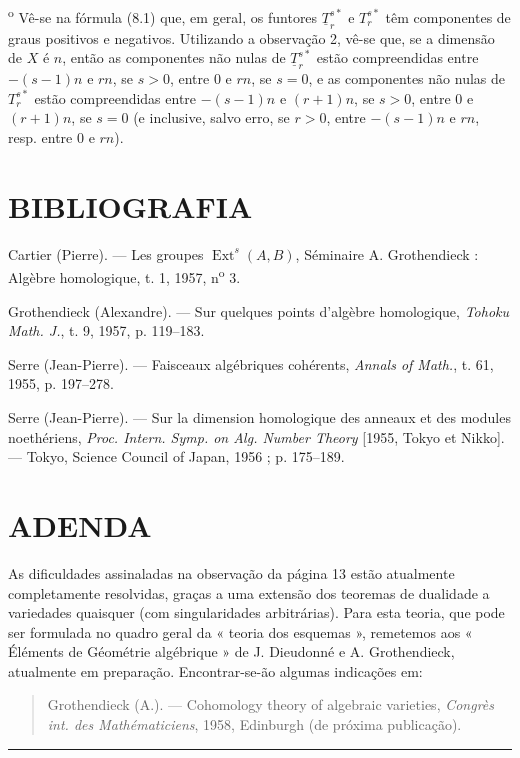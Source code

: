 \medskip
{}\textsuperscript{o} Vê-se na fórmula (8.1) que, em geral, os
funtores $\underline{T}_{r}^{s*}$ e $T_{r}^{s*}$ têm componentes de
graus positivos e negativos. Utilizando a observação 2, vê-se que, se a
dimensão de $X$ é $n$, então as componentes não nulas de
$\underline{T}_{r}^{s*}$ estão compreendidas entre $-(s-1)n$ e $rn$, se $s>0$,
entre $0$ e $rn$, se $s=0$, e as componentes não nulas de $T_{r}^{s*}$
estão compreendidas entre $-(s-1)n$ e $(r+1)n$, se $s>0$, entre $0$ e $(r+1)n$,
se $s=0$ (e inclusive, salvo erro, se $r>0$, entre $-(s-1)n$ e $rn$, resp. entre
$0$ e $rn$).

\section*{BIBLIOGRAFIA}

\noindent[1] Cartier (Pierre). --- Les groupes
$\operatorname{Ext}^{s}(A,B)$, Séminaire A. Grothendieck : Algèbre homologique,
t. 1, 1957, n\textsuperscript{o} 3.

\noindent[2] Grothendieck (Alexandre). --- Sur quelques points d'algèbre
homologique, \emph{Tohoku Math. J.}, t. 9, 1957, p. 119--183.

\noindent[3] Serre (Jean-Pierre). --- Faisceaux algébriques cohérents,
\emph{Annals of Math.}, t. 61, 1955, p. 197--278.

\noindent[4] Serre (Jean-Pierre). --- Sur la dimension homologique des anneaux
et des modules noethériens, \emph{Proc. Intern. Symp. on Alg. Number Theory}
[1955, Tokyo et Nikko]. --- Tokyo, Science Council of Japan, 1956 ;
p. 175--189.

\clearpage
{}
\section*{ADENDA}

As dificuldades assinaladas na observação da página 13 estão atualmente
completamente resolvidas, graças a uma extensão dos teoremas de dualidade a
variedades quaisquer (com singularidades arbitrárias). Para esta teoria, que pode
ser formulada no quadro geral da « teoria dos esquemas », remetemos
aos « Éléments de Géométrie algébrique » de J. Dieudonné e A. Grothendieck,
atualmente em preparação. Encontrar-se-ão algumas indicações em:

\begin{quote}
Grothendieck (A.). --- Cohomology theory of algebraic varieties,
\emph{Congrès int. des Mathématiciens}, 1958, Edinburgh (de próxima publicação).
\end{quote}

\begin{flushright}
[Abril de 1959]
\end{flushright}

\begin{center}\rule{36mm}{0.5pt}\end{center}

\par
